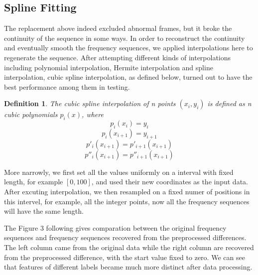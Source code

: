 \documentclass[a4paper, 11pt]{article} %
\newtheorem{definition}{{Definition}}
\begin{document}
\subsection{Spline Fitting}
The replacement above indeed excluded abnormal frames, but it broke the continuity of the sequence in some ways. In order to reconstruct the continuity and eventually smooth the frequency sequences, we applied interpolations here to regenerate the sequence. After attempting different kinds of interpolations including polynomial interpolation, Hermite interpolation and spline interpolation, cubic spline interpolation, as defined below, turned out to have the best performance among them in testing.
\begin{definition}
The cubic spline interpolation of n points $(x_i,y_i)$ is defined as n cubic polynomials $p_i(x)$, where\\
$$p_i(x_i)=y_i$$
$$p_i(x_{i+1})=y_{i+1}$$
$$p'_i(x_{i+1})=p'_{i+1}(x_{i+1})$$
$$p''_i(x_{i+1})=p''_{i+1}(x_{i+1})$$
\end{definition}
\par
More narrowly, we first set all the values uniformly on a interval with fixed length, for example $[0,100]$, and used their new coordinates as the input data. After excuting interpolation, we then resampled on a fixed numer of positions in this intervel, for example, all the integer points, now all the frequency sequences will have the same length.
\par
The Figure 3 following gives comparation between the original frequency sequences and frequency sequences recovered from the preprocessed differences. The left column came from the original data while the right column are recovered from the preprocessed difference, with the start value fixed to zero. We can see that features of different labels became much more distinct after data processing.
\end{document}
